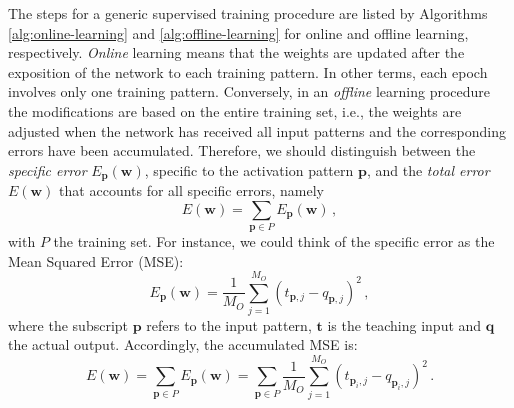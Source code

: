 \documentclass[12pt, a4paper, twoside, openright, notitlepage]{report}
\numberwithin{equation}{chapter}
\theoremstyle{theorem}
\theoremstyle{definition}
\theoremstyle{remark}
\theoremstyle{proposition}
\numberwithin{figure}{chapter}
\begin{document}
		The steps for a generic supervised training procedure are listed by Algorithms \ref{alg:online-learning} and \ref{alg:offline-learning} for online and offline learning, respectively. \emph{Online} learning means that the weights are updated after the exposition of the network to each training pattern. In other terms, each epoch involves only one training pattern. Conversely, in an \emph{offline} learning procedure the modifications are based on the entire training set, i.e., the weights are adjusted when the network has received all input patterns and the corresponding errors have been accumulated. Therefore, we should distinguish between the \emph{specific error} $E_{\mathbf{p}}(\mathbf{w})$, specific to the activation pattern $\mathbf{p}$, and the \emph{total error} $E(\mathbf{w})$ that accounts for all specific errors, namely
		\begin{equation}
			\label{eq:accumulated-error}
			E(\mathbf{w}) = \sum_{\mathbf{p} \in P} E_{\mathbf{p}}(\mathbf{w}) \, ,
		\end{equation}
		with $P$ the training set. For instance, we could think of the specific error as the Mean Squared Error (MSE): 
		\begin{equation}
			\label{eq:mse}
			E_{\mathbf{p}}(\mathbf{w}) = \dfrac{1}{M_O} \sum_{j = 1}^{M_O} \left( t_{\mathbf{p},j} - q_{\mathbf{p},j} \right)^2 \, ,
		\end{equation}
		where the subscript $\mathbf{p}$ refers to the input pattern, $\mathbf{t}$ is the teaching input and $\mathbf{q}$ the actual output. Accordingly, the accumulated MSE is:
		\begin{equation}
			\label{eq:accumulated-mse}
			E(\mathbf{w}) = \sum_{\mathbf{p} \in P} E_{\mathbf{p}}(\mathbf{w}) = \sum_{\mathbf{p} \in P} \dfrac{1}{M_O} \sum_{j = 1}^{M_O} \left( t_{\mathbf{p}_i,j} - q_{\mathbf{p}_i,j} \right)^2 \, .
		\end{equation}
				
		\vspace*{0.3cm}
		
\end{document}
